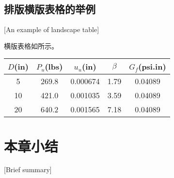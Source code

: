 \subsection{排版横版表格的举例}[An example of landscape table]

横版表格如所示。

\begin{table}[p]
	\centering
	\begin{sideways}
		\begin{minipage}{\textheight}
			\vspace{0.5em}\centering\wuhao
			\begin{tabular}{ccccc}
				\toprule[1.5pt]
				$D$(in) & $P_u$(lbs) & $u_u$(in) & $\beta$ & $G_f$(psi.in) \\
				\midrule[1pt]
				5       & 269.8      & 0.000674  & 1.79    & 0.04089       \\
				10      & 421.0      & 0.001035  & 3.59    & 0.04089       \\
				20      & 640.2      & 0.001565  & 7.18    & 0.04089       \\
				\bottomrule[1.5pt]
			\end{tabular}
		\end{minipage}
	\end{sideways}
\end{table}



\section{本章小结}[Brief summary]

\lipsum[1]
